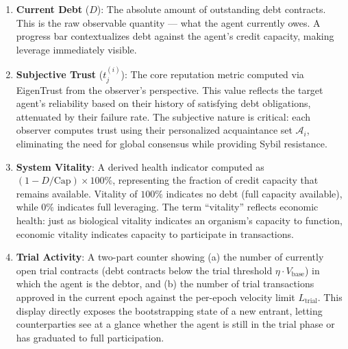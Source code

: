 \documentclass[11pt]{article}
\begin{document}
\begin{enumerate}
    \item \textbf{Current Debt} ($D$): The absolute amount of outstanding debt contracts. This is the raw observable quantity --- what the agent currently owes. A progress bar contextualizes debt against the agent's credit capacity, making leverage immediately visible.

    \item \textbf{Subjective Trust} ($t^{(i)}_j$): The core reputation metric computed via EigenTrust from the observer's perspective. This value reflects the target agent's reliability based on their history of satisfying debt obligations, attenuated by their failure rate. The subjective nature is critical: each observer computes trust using their personalized acquaintance set $\mathcal{A}_i$, eliminating the need for global consensus while providing Sybil resistance.

    \item \textbf{System Vitality}: A derived health indicator computed as $(1 - D / \text{Cap}) \times 100\%$, representing the fraction of credit capacity that remains available. Vitality of $100\%$ indicates no debt (full capacity available), while $0\%$ indicates full leveraging. The term ``vitality'' reflects economic health: just as biological vitality indicates an organism's capacity to function, economic vitality indicates capacity to participate in transactions.

    \item \textbf{Trial Activity}: A two-part counter showing (a) the number of currently open trial contracts (debt contracts below the trial threshold $\eta \cdot V_{\text{base}}$) in which the agent is the debtor, and (b) the number of trial transactions approved in the current epoch against the per-epoch velocity limit $L_{\text{trial}}$. This display directly exposes the bootstrapping state of a new entrant, letting counterparties see at a glance whether the agent is still in the trial phase or has graduated to full participation.


\end{enumerate}
\end{document}

